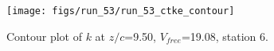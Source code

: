 \begin{figure}[H]
\centering
\texttt{[image: figs/run\_53/run\_53\_ctke\_contour]}
\caption{Contour plot of $k$ at $z/c$=9.50, $V_{free}$=19.08, station 6.}
\end{figure}


